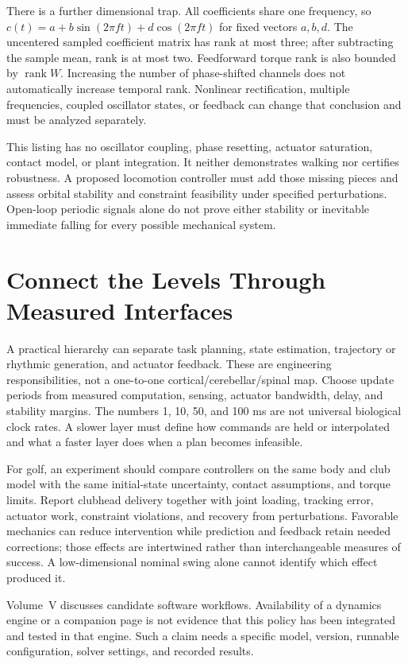 There is a further dimensional trap. All coefficients share one frequency, so
$c(t)=a+b\sin(2\pi ft)+d\cos(2\pi ft)$ for fixed vectors $a,b,d$.
The uncentered sampled coefficient matrix has rank at most three; after
subtracting the sample mean, rank is at most two. Feedforward torque rank is
also bounded by $\operatorname{rank}W$. Increasing the number of phase-shifted
channels does not automatically increase temporal rank. Nonlinear rectification,
multiple frequencies, coupled oscillator states, or feedback can change that
conclusion and must be analyzed separately.

This listing has no oscillator coupling, phase resetting, actuator saturation,
contact model, or plant integration. It neither demonstrates walking nor
certifies robustness. A proposed locomotion controller must add those missing
pieces and assess orbital stability and constraint feasibility under specified
perturbations. Open-loop periodic signals alone do not prove either stability
or inevitable immediate falling for every possible mechanical system.

\section{Connect the Levels Through Measured Interfaces}

A practical hierarchy can separate task planning, state estimation, trajectory
or rhythmic generation, and actuator feedback. These are engineering
responsibilities, not a one-to-one cortical/cerebellar/spinal map. Choose update
periods from measured computation, sensing, actuator bandwidth, delay, and
stability margins. The numbers 1, 10, 50, and 100 ms are not universal biological
clock rates. A slower layer must define how commands are held or interpolated
and what a faster layer does when a plan becomes infeasible.

For golf, an experiment should compare controllers on the same body and club
model with the same initial-state uncertainty, contact assumptions, and torque
limits. Report clubhead delivery together with joint loading, tracking error,
actuator work, constraint violations, and recovery from perturbations. Favorable
mechanics can reduce intervention while prediction and feedback retain needed
corrections; those effects are intertwined rather than interchangeable measures
of success. A low-dimensional nominal swing alone cannot identify which effect
produced it.

Volume~V discusses candidate software workflows. Availability of a dynamics
engine or a companion page is not evidence that this policy has been integrated
and tested in that engine. Such a claim needs a specific model, version, runnable
configuration, solver settings, and recorded results.

